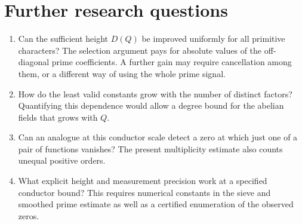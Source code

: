 \documentclass[11pt]{article}
\begin{document}
\section{Further research questions}
\begin{enumerate}
\item Can the sufficient height \(D(Q)\) be improved uniformly for all primitive characters? The selection argument pays for absolute values of the off-diagonal prime coefficients. A further gain may require cancellation among them, or a different way of using the whole prime signal.
\item How do the least valid constants grow with the number of distinct factors? Quantifying this dependence would allow a degree bound for the abelian fields that grows with \(Q\).
\item Can an analogue at this conductor scale detect a zero at which just one of a pair of functions vanishes? The present multiplicity estimate also counts unequal positive orders.
\item What explicit height and measurement precision work at a specified conductor bound? This requires numerical constants in the sieve and smoothed prime estimate as well as a certified enumeration of the observed zeros.
\end{enumerate}
\end{document}

